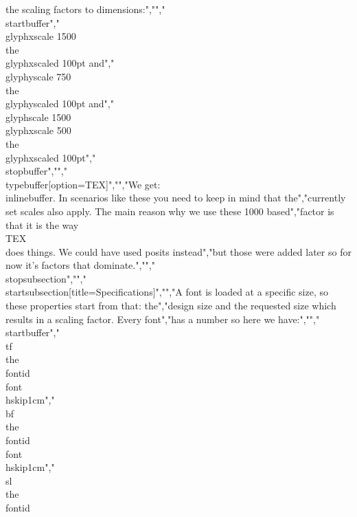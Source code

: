 the scaling factors to dimensions:","","\\startbuffer","{\\glyphxscale 1500                  \\the\\glyphxscaled 100pt} and","{\\glyphyscale  750                  \\the\\glyphyscaled 100pt} and","{\\glyphscale  1500 \\glyphxscale 500 \\the\\glyphxscaled 100pt}","\\stopbuffer","","\\typebuffer[option=TEX]","","We get: \\inlinebuffer. In scenarios like these you need to keep in mind that the","currently set scales also apply. The main reason why we use these 1000 based","factor is that it is the way \\TEX\\ does things. We could have used posits instead","but those were added later so for now it's factors that dominate.","","\\stopsubsection","","\\startsubsection[title=Specifications]","","A font is loaded at a specific size, so these properties start from that: the","design size and the requested size which results in a scaling factor. Every font","has a number so here we have:","","\\startbuffer","\\tf \\the \\fontid \\font \\hskip1cm","\\bf \\the \\fontid \\font \\hskip1cm","\\sl \\the \\fontid 